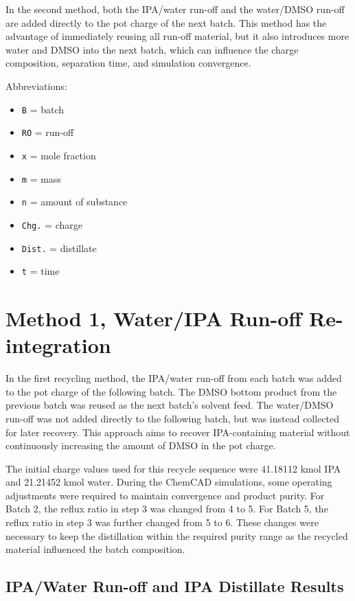 In the second method, both the IPA/water run-off and the water/DMSO
run-off are added directly to the pot charge of the next batch. This
method has the advantage of immediately reusing all run-off material,
but it also introduces more water and DMSO into the next batch, which
can influence the charge composition, separation time, and simulation
convergence.

Abbreviations:

\begin{itemize}
\tightlist
\item
  \texttt{B} = batch
\item
  \texttt{RO} = run-off
\item
  \texttt{x} = mole fraction
\item
  \texttt{m} = mass
\item
  \texttt{n} = amount of substance
\item
  \texttt{Chg.} = charge
\item
  \texttt{Dist.} = distillate
\item
  \texttt{t} = time
\end{itemize}

\section{Method 1, Water/IPA Run-off
Re-integration}\label{method-1-wateripa-run-off-re-integration}

In the first recycling method, the IPA/water run-off from each batch was
added to the pot charge of the following batch. The DMSO bottom product
from the previous batch was reused as the next batch's solvent feed. The
water/DMSO run-off was not added directly to the following batch, but
was instead collected for later recovery. This approach aims to recover
IPA-containing material without continuously increasing the amount of
DMSO in the pot charge.

The initial charge values used for this recycle sequence were 41.18112
kmol IPA and 21.21452 kmol water. During the ChemCAD simulations, some
operating adjustments were required to maintain convergence and product
purity. For Batch 2, the reflux ratio in step 3 was changed from 4 to 5.
For Batch 5, the reflux ratio in step 3 was further changed from 5 to 6.
These changes were necessary to keep the distillation within the
required purity range as the recycled material influenced the batch
composition.

\subsection{IPA/Water Run-off and IPA Distillate
Results}\label{ipawater-run-off-and-ipa-distillate-results}

